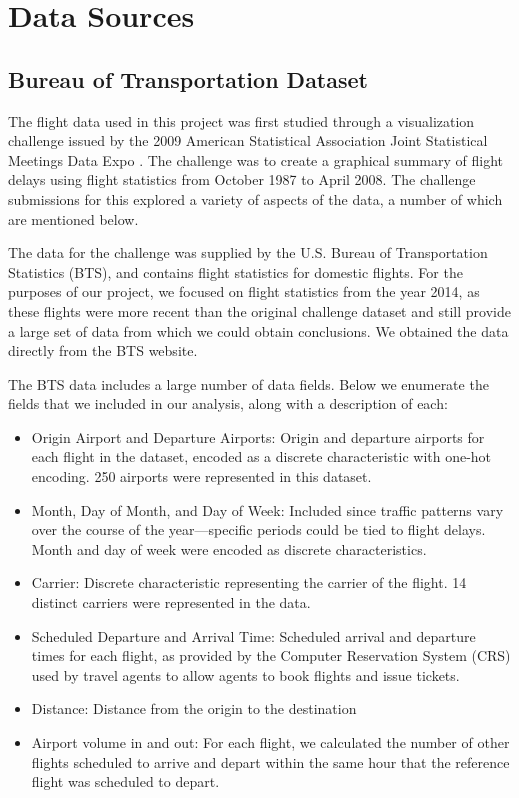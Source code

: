 \documentclass[twocolumn]{article}
\begin{document}
\section{Data Sources}

\label{sec:data-sources}
\subsection{Bureau of Transportation Dataset}

The flight data used in this project was first studied through a visualization challenge issued by the 2009 American Statistical Association Joint Statistical Meetings Data Expo \citep{wickham2011asa}.
The challenge was to create a graphical summary of flight delays using flight statistics from October 1987 to April 2008.
The challenge submissions for this explored a variety of aspects of the data, a number of which are mentioned below.

The data for the challenge was supplied by the U.S. Bureau of Transportation Statistics (BTS), and contains flight statistics for domestic flights. 
For the purposes of our project, we focused on flight statistics from the year 2014, as these flights were more recent than the original challenge dataset and still provide a large set of data from which we could obtain conclusions. 
We obtained the data directly from the BTS website.

The BTS data includes a large number of data fields. Below we enumerate the fields that we included in our analysis, along with a description of each:

\begin{itemize}
\item Origin Airport and Departure Airports: Origin and departure airports for each flight in the dataset, encoded as a discrete characteristic with one-hot encoding. 250 airports were represented in this dataset.
\item Month, Day of Month, and Day of Week: Included since traffic patterns vary over the course of the year---specific periods could be tied to flight delays. Month and day of week were encoded as discrete characteristics.
\item Carrier: Discrete characteristic representing the carrier of the flight. 14 distinct carriers were represented in the data.
\item Scheduled Departure and Arrival Time: Scheduled arrival and departure times for each flight, as provided by the Computer Reservation System (CRS) used by travel agents to allow agents to book flights and issue tickets.
\item Distance: Distance from the origin to the destination
\item Airport volume in and out: For each flight, we calculated the number of other flights scheduled to arrive and depart within the same hour that the reference flight was scheduled to depart. 
\end{itemize}
\end{document}
